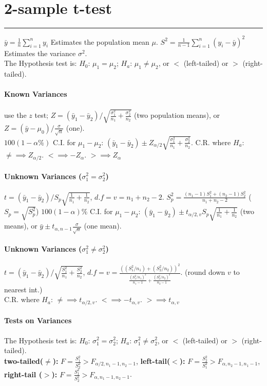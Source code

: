 \documentclass[10pt]{article}
\begin{document}
\section*{2-sample t-test}
\hrule width 10cm
\vspace{6pt}
$\bar{y} = \frac{1}{n} \sum_{i=1}^{n} y_i$ Estimates the population mean $\mu$. $S^2 = \frac{1}{n-1}\sum_{i=1}^{n} (y_i - \bar{y})^2$ Estimates the variance $\sigma^2$. \\
The Hypothesis test is:     $H_0$: $\mu_1 = \mu_2$; $H_a$: $\mu_1 \neq \mu_2$, or $<$ (left-tailed) or $>$ (right-tailed).
\paragraph{Known Variances} use the $z$ test; $Z = (\bar{y}_1 - \bar{y}_2) / \sqrt{\frac{\sigma_1^2}{n_1} + \frac{\sigma_2^2}{n_2}}$ (two population means), or $Z = (\bar{y} - \mu_0) / \frac{\sigma}{\sqrt{n}}$ (one). \\
$100(1-\alpha\%)$ C.I. for $\mu_1 - \mu_2$: $(\bar{y}_1 - \bar{y}_2) \pm Z_{\alpha/2}\sqrt{\frac{\sigma_1^2}{n_1} + \frac{\sigma_2^2}{n_2}}$. 
C.R. where $H_a$: $\neq \implies Z_{\alpha / 2}$. $< \implies -Z_{\alpha}$. $> \implies Z_{\alpha}$  
\paragraph{Unknown Variances ($\sigma_1^2 = \sigma_2^2$)} $t = (\bar{y}_1 - \bar{y}_2) / S_p \sqrt{\frac{1}{n_1} + \frac{1}{n_2}}$, $d.f = v = n_1 + n_2 - 2$. $S_p^2 = \frac{(n_1 - 1)S_1^2 + (n_2 - 1)S_2^2}{n_1 + n_2 - 2}$ ($S_p = \sqrt{S_p^2}$)
$100(1-\alpha)\%$ C.I. for $\mu_1 - \mu_2$: $(\bar{y}_1 - \bar{y}_2) \pm t_{\alpha/2, v}S_p \sqrt{\frac{1}{n_1} + \frac{1}{n_2}}$ (two means), or $\bar{y} \pm t_{\alpha,n-1}\frac{\sigma}{\sqrt{n}}$ (one mean).
\paragraph{Unknown Variances ($\sigma_1^2 \neq \sigma_2^2$)} $t = (\bar{y}_1 - \bar{y}_2) / \sqrt{\frac{S_1^2}{n_1} + \frac{S_2^2}{n_2}}$, $d.f = v = \frac{((S_1^2/n_1) + (S_2^2/n_2))^2}{\frac{(S_1^2/n_1)^2}{n_1 - 1} + \frac{(S_2^2/n_2)^2}{n_2 - 1}}$. (round down $v$ to nearest int.) \\
C.R. where $H_a$: $\neq \implies t_{\alpha / 2, v}$. $< \implies -t_{\alpha, v}$. $> \implies t_{\alpha, v}$ 
\paragraph{Tests on Variances}
The Hypothesis test is:     $H_0$: $\sigma_1^2 = \sigma_2^2$; $H_a$: $\sigma_1^2 \neq \sigma_2^2$, or $<$ (left-tailed) or $>$ (right-tailed).\\
\textbf{two-tailed($\neq$):} $F = \frac{S_1^2}{S_2^2} > F_{\alpha/2, n_1 - 1, n_2 - 1}$, 
\textbf{left-tail($<$):} $F = \frac{S_2^2}{S_1^2} > F_{\alpha, n_2 - 1, n_1 - 1}$, 
\textbf{right-tail ($>$):} $F = \frac{S_1^2}{S_2^2} > F_{\alpha, n_1 - 1, n_2 - 1}$.
\end{document}

